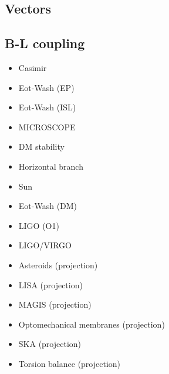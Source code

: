 \documentclass[9pt,twocolumn]{extarticle}
\begin{document}
\begin{mdframed}
\vspace{-1em}
\section{Vectors}\vspace{-0.5em}

\subsection*{B-L coupling}\vspace{-0.5em}
\begin{itemize}\setlength\itemsep{-0.5em}
	\item Casimir~\cite{Bordag:2001qi,Decca:2005qz,Sushkov:2011md}
	\item Eot-Wash (EP)~\cite{Hees:2018fpg}
	\item Eot-Wash (ISL)~\cite{Adelberger:2009zz}
	\item MICROSCOPE~\cite{MICROSCOPE:2022doy}
	\item DM stability~\cite{Chun:2022qcg}
	\item Horizontal branch~\cite{Hardy:2016kme}
	\item Sun~\cite{Hardy:2016kme}
	\item Eot-Wash (DM)~\cite{Shaw:2021gnp}
	\item LIGO (O1)~\cite{LIGOScientific:2021ffg}
	\item LIGO/VIRGO~\cite{LIGOScientific:2021ffg}
	\item Asteroids (projection)~\cite{Fedderke:2022ptm}
	\item LISA (projection)~\cite{Fedderke:2022ptm}
	\item MAGIS (projection)~\cite{MAGIS}
	\item Optomechanical membranes (projection)~\cite{Manley:2020mjq}
	\item SKA (projection)~\cite{Graham:2015ifn}
	\item Torsion balance (projection)~\cite{Graham:2015ifn}
	
\end{itemize}
\end{mdframed}

\newpage 
\end{document}
